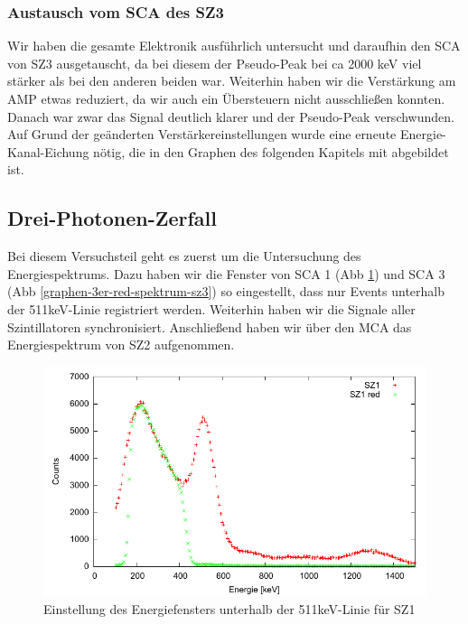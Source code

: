 \subsubsection{Austausch vom SCA des SZ3}
Wir haben die gesamte Elektronik ausführlich untersucht und daraufhin den SCA von SZ3 ausgetauscht, da bei diesem der Pseudo-Peak bei ca 2000 keV viel stärker als bei den anderen beiden war. Weiterhin haben wir die Verstärkung am AMP etwas reduziert, da wir auch ein Übersteuern nicht ausschließen konnten. Danach war zwar das Signal deutlich klarer und der Pseudo-Peak verschwunden. Auf Grund der geänderten Verstärkereinstellungen wurde eine erneute Energie-Kanal-Eichung nötig, die in den Graphen des folgenden Kapitels mit abgebildet ist. 

\subsection{Drei-Photonen-Zerfall}

Bei diesem Versuchsteil geht es zuerst um die Untersuchung des Energiespektrums. Dazu haben wir die Fenster von SCA 1 (Abb \ref{graphen-3er-red-spektrum-sz1}) und SCA 3 (Abb \ref{graphen-3er-red-spektrum-sz3}) so eingestellt, dass nur Events unterhalb der 511keV-Linie registriert werden. Weiterhin haben wir die Signale aller Szintillatoren synchronisiert. Anschließend haben wir über den MCA das Energiespektrum von SZ2 aufgenommen. 
\begin{figure}[H]
 \includegraphics[width=\textwidth]{Graphen/3er/red-spektrum-sz1.pdf}
 \caption{Einstellung des Energiefensters unterhalb der 511keV-Linie für SZ1}
 \label{graphen-3er-red-spektrum-sz1}
\end{figure}


